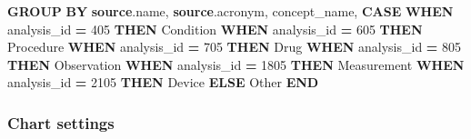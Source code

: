 \documentclass[
]{book}
\newenvironment{Shaded}{\begin{snugshade}}{\end{snugshade}}
\newcommand{\ControlFlowTok}[1]{\textcolor[rgb]{0.13,0.29,0.53}{\textbf{#1}}}
\newcommand{\DecValTok}[1]{\textcolor[rgb]{0.00,0.00,0.81}{#1}}
\newcommand{\KeywordTok}[1]{\textcolor[rgb]{0.13,0.29,0.53}{\textbf{#1}}}
\newcommand{\NormalTok}[1]{#1}
\newcommand{\OperatorTok}[1]{\textcolor[rgb]{0.81,0.36,0.00}{\textbf{#1}}}
\newcommand{\StringTok}[1]{\textcolor[rgb]{0.31,0.60,0.02}{#1}}
\begin{document}
\begin{Shaded}
\begin{Highlighting}[]
\KeywordTok{GROUP} \KeywordTok{BY} \KeywordTok{source}\NormalTok{.name, }\KeywordTok{source}\NormalTok{.acronym, concept\_name, }
    \ControlFlowTok{CASE} \ControlFlowTok{WHEN}\NormalTok{ analysis\_id }\OperatorTok{=} \DecValTok{405} \ControlFlowTok{THEN} \StringTok{\textquotesingle{}Condition\textquotesingle{}}
    \ControlFlowTok{WHEN}\NormalTok{ analysis\_id }\OperatorTok{=} \DecValTok{605} \ControlFlowTok{THEN} \StringTok{\textquotesingle{}Procedure\textquotesingle{}}
    \ControlFlowTok{WHEN}\NormalTok{ analysis\_id }\OperatorTok{=} \DecValTok{705} \ControlFlowTok{THEN} \StringTok{\textquotesingle{}Drug\textquotesingle{}}
    \ControlFlowTok{WHEN}\NormalTok{ analysis\_id }\OperatorTok{=} \DecValTok{805} \ControlFlowTok{THEN} \StringTok{\textquotesingle{}Observation\textquotesingle{}}
    \ControlFlowTok{WHEN}\NormalTok{ analysis\_id }\OperatorTok{=} \DecValTok{1805} \ControlFlowTok{THEN} \StringTok{\textquotesingle{}Measurement\textquotesingle{}}
    \ControlFlowTok{WHEN}\NormalTok{ analysis\_id }\OperatorTok{=} \DecValTok{2105} \ControlFlowTok{THEN} \StringTok{\textquotesingle{}Device\textquotesingle{}}
    \ControlFlowTok{ELSE} \StringTok{\textquotesingle{}Other\textquotesingle{}} \ControlFlowTok{END}
\end{Highlighting}
\end{Shaded}

\hypertarget{chart-settings-26}{%
\subsubsection*{Chart settings}\label{chart-settings-26}}
\end{document}

